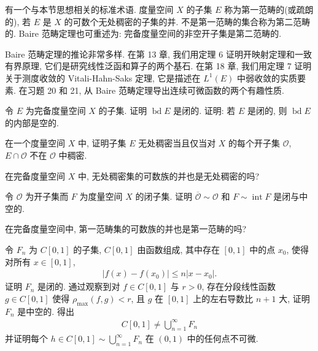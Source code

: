 \documentclass[../../main.tex]{subfiles}
\begin{document}
\begin{remark}\label{remark:ch10-第一范畴}
有一个与本节思想相关的标准术语. 度量空间 $X$ 的子集 $E$ 称为第一范畴的(或疏朗的), 若 $E$ 是 $X$ 的可数个无处稠密的子集的并. 不是第一范畴的集合称为第二范畴的. Baire 范畴定理也可重述为: 完备度量空间的非空开子集是第二范畴的.
\end{remark}

\begin{remark}\label{remark:ch10-baire应用}
Baire 范畴定理的推论非常多样. 在第 13 章, 我们用定理 6 证明开映射定理和一致有界原理, 它们是研究线性泛函和算子的两个基石. 在第 18 章, 我们用定理 7 证明关于测度收敛的 Vitali-Hahn-Saks 定理, 它是描述在 $L^{1}(E)$ 中弱收敛的实质要素. 在习题 20 和 21, 从 Baire 范畴定理导出连续可微函数的两个有趣性质.
\end{remark}

\begin{exercise}\label{exercise:ch10-15}
令 $E$ 为完备度量空间 $X$ 的子集. 证明 $\operatorname{bd}E$ 是闭的. 证明: 若 $E$ 是闭的, 则 $\operatorname{bd}E$ 的内部是空的.
\end{exercise}

\begin{exercise}\label{exercise:ch10-16}
在一个度量空间 $X$ 中, 证明子集 $E$ 无处稠密当且仅当对 $X$ 的每个开子集 $\mathcal{O}$, $E\cap\mathcal{O}$ 不在 $\mathcal{O}$ 中稠密.
\end{exercise}

\begin{exercise}\label{exercise:ch10-17}
在完备度量空间 $X$ 中, 无处稠密集的可数族的并也是无处稠密的吗?
\end{exercise}

\begin{exercise}\label{exercise:ch10-18}
令 $\mathcal{O}$ 为开子集而 $F$ 为度量空间 $X$ 的闭子集. 证明 $\overline{\mathcal{O}}\sim\mathcal{O}$ 和 $F\sim\operatorname{int}F$ 是闭与中空的.
\end{exercise}

\begin{exercise}\label{exercise:ch10-19}
在完备度量空间中, 第一范畴集的可数族的并也是第一范畴的吗?
\end{exercise}

\begin{exercise}\label{exercise:ch10-20}
令 $F_{n}$ 为 $C[0,1]$ 的子集, $C[0,1]$ 由函数组成, 其中存在 $[0,1]$ 中的点 $x_{0}$, 使得对所有 $x\in[0,1]$,
\begin{align*}
|f(x)-f(x_{0})|\leqslant n|x-x_{0}|.
\end{align*}
证明 $F_{n}$ 是闭的. 通过观察到对 $f\in C[0,1]$ 与 $r>0$, 存在分段线性函数 $g\in C[0,1]$ 使得 $\rho_{\max}(f,g)<r$, 且 $g$ 在 $[0,1]$ 上的左右导数比 $n+1$ 大, 证明 $F_{n}$ 是中空的. 得出
\begin{align*}
C[0,1]\neq\bigcup_{n=1}^{\infty}F_{n}
\end{align*}
并证明每个 $h\in C[0,1]\sim\bigcup_{n=1}^{\infty}F_{n}$ 在 $(0,1)$ 中的任何点不可微.
\end{exercise}
\end{document}
